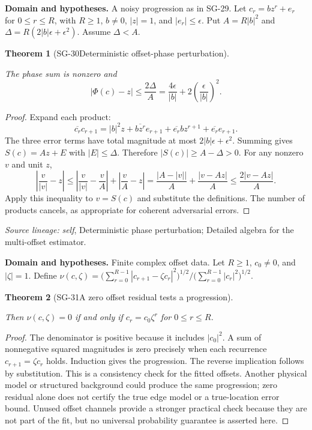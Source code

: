 \documentclass[11pt]{article}
\newtheorem{theorem}{Theorem}[section]
\theoremstyle{definition}\newtheorem{definition}[theorem]{Definition}
\theoremstyle{remark}\newtheorem{remark}[theorem]{Remark}
\begin{document}
\par{\small\textbf{Domain and hypotheses.} A noisy progression as in SG-29. Let $c_r=bz^r+e_r$ for $0\le r\le R$, with $R\ge1$, $b\ne0$, $|z|=1$, and $|e_r|\le\epsilon$. Put $A=R|b|^2$ and $\Delta=R(2|b|\epsilon+\epsilon^2)$. Assume $\Delta<A$.}\par
\begin{theorem}[SG-30\quad Deterministic offset-phase perturbation]\label{SG-30}

The phase sum is nonzero and
\[
 |\Phi(c)-z|\le\frac{2\Delta}{A}
 =\frac{4\epsilon}{|b|}+2\left(\frac\epsilon{|b|}\right)^2.
\]

\end{theorem}
\begin{proof}

Expand each product:
\[
 \overline{c_r}c_{r+1}=|b|^2z
 +\overline{bz^r}e_{r+1}+\overline{e_r}bz^{r+1}
 +\overline{e_r}e_{r+1}.
\]
The three error terms have total magnitude at most
$2|b|\epsilon+\epsilon^2$. Summing gives $S(c)=Az+E$ with $|E|\le\Delta$.
Therefore $|S(c)|\ge A-\Delta>0$.
For any nonzero $v$ and unit $z$,
\[
 \left|\frac v{|v|}-z\right|
 \le\left|\frac v{|v|}-\frac vA\right|+\left|\frac vA-z\right|
 =\frac{\bigl|A-|v|\bigr|}{A}+\frac{|v-Az|}{A}
 \le\frac{2|v-Az|}{A}.
\]
Apply this inequality to $v=S(c)$ and substitute the definitions.
The number of products cancels, as appropriate for coherent adversarial errors.

\end{proof}

\par{\small\color{Teal}\textit{Source lineage:} \textit{self}, Deterministic phase perturbation; Detailed algebra for the multi-offset estimator.}\par

\par{\small\textbf{Domain and hypotheses.} Finite complex offset data. Let $R\ge1$, $c_0\ne0$, and $|\zeta|=1$. Define $\nu(c,\zeta)=\bigl(\sum_{r=0}^{R-1}|c_{r+1}-\zeta c_r|^2\bigr)^{1/2}/\bigl(\sum_{r=0}^{R-1}|c_r|^2\bigr)^{1/2}$.}\par
\begin{theorem}[SG-31\quad A zero offset residual tests a progression]\label{SG-31}

Then $\nu(c,\zeta)=0$ if and only if $c_r=c_0\zeta^r$ for
$0\le r\le R$.

\end{theorem}
\begin{proof}

The denominator is positive because it includes $|c_0|^2$.
A sum of nonnegative squared magnitudes is zero precisely when each recurrence
$c_{r+1}=\zeta c_r$ holds. Induction gives the progression. The reverse
implication follows by substitution. This is a consistency check for the
fitted offsets. Another physical model or structured background could produce
the same progression; zero residual alone does not certify the true edge
model or a true-location error bound. Unused offset channels provide a
stronger practical check because they are not part of the fit, but no
universal probability guarantee is asserted here.

\end{proof}
\end{document}
